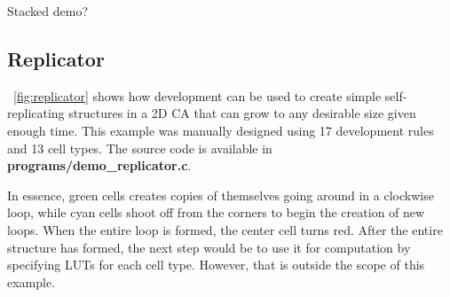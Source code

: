 \TODO
Stacked demo?

\subsection{Replicator}

\figurename~\ref{fig:replicator} shows how development can be used to create simple self-replicating structures in a 2D CA that can grow to any desirable size given enough time.
This example was manually designed using 17 development rules and 13 cell types.
The source code is available in \textbf{programs/demo\_replicator.c}.

In essence, green cells creates copies of themselves going around in a clockwise loop, while cyan cells shoot off from the corners to begin the creation of new loops.
When the entire loop is formed, the center cell turns red.
After the entire structure has formed, the next step would be to use it for computation by specifying LUTs for each cell type.
However, that is outside the scope of this example.

